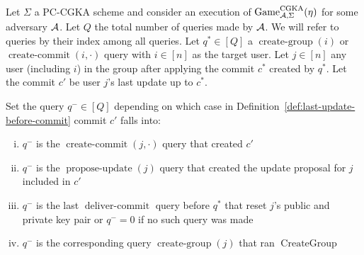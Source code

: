 \begin{definition} \label{def:safe-commit-wrt-user}
	Let $\Sigma$ a PC-CGKA scheme and consider an execution of $\mathrm{Game}_{\mathcal{A}, \Sigma}^{\mathrm{CGKA}}(\eta)$ for some adversary $\mathcal{A}$. Let $Q$ the total number of queries made by $\mathcal{A}$. We will refer to queries by their index among all queries. Let $q^* \in [Q]$ a $\operatorname{create-group}(i)$ or $\operatorname{create-commit}(i, \cdot)$ query with $i \in [n]$ as the target user. Let $j \in [n]$ any user (including $i$) in the group after applying the commit $c^*$ created by $q^*$. Let the commit $c'$ be user $j$'s last update up to $c^*$.

	Set the query $q^- \in [Q]$ depending on which case in Definition~\ref{def:last-update-before-commit} commit $c'$ falls into:
	\begin{enumerate}[(i)]
		\item $q^-$ is the $\operatorname{create-commit}(j, \cdot)$ query that created $c'$
		\item $q^-$ is the $\operatorname{propose-update}(j)$ query that created the update proposal for $j$ included in $c'$
		\item $q^-$ is the last $\operatorname{deliver-commit}$ query before $q^*$ that reset $j$'s public and private key pair or $q^- = 0$ if no such query was made
		\item $q^-$ is the corresponding query $\operatorname{create-group}(j)$ that ran $\operatorname{CreateGroup}$
	\end{enumerate}



\end{definition}
